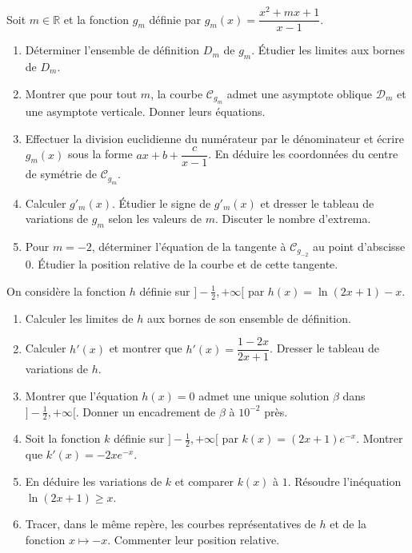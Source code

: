\documentclass[11pt]{article}
\begin{document}
\begin{exercice}
Soit $m \in \mathbb{R}$ et la fonction $g_m$ définie par $g_m(x) = \dfrac{x^2 + mx + 1}{x - 1}$.
\begin{enumerate}
    \item Déterminer l'ensemble de définition $D_m$ de $g_m$. Étudier les limites aux bornes de $D_m$.
    \item Montrer que pour tout $m$, la courbe $\mathcal{C}_{g_m}$ admet une asymptote oblique $\mathcal{D}_m$ et une asymptote verticale. Donner leurs équations.
    \item Effectuer la division euclidienne du numérateur par le dénominateur et écrire $g_m(x)$ sous la forme $ax + b + \dfrac{c}{x-1}$. En déduire les coordonnées du centre de symétrie de $\mathcal{C}_{g_m}$.
    \item Calculer $g'_m(x)$. Étudier le signe de $g'_m(x)$ et dresser le tableau de variations de $g_m$ selon les valeurs de $m$. Discuter le nombre d'extrema.
    \item Pour $m = -2$, déterminer l'équation de la tangente à $\mathcal{C}_{g_{-2}}$ au point d'abscisse $0$. Étudier la position relative de la courbe et de cette tangente.
\end{enumerate}
\end{exercice}

\begin{exercice}
On considère la fonction $h$ définie sur $]-\frac{1}{2}, +\infty[$ par $h(x) = \ln(2x+1) - x$.
\begin{enumerate}
    \item Calculer les limites de $h$ aux bornes de son ensemble de définition.
    \item Calculer $h'(x)$ et montrer que $h'(x) = \dfrac{1 - 2x}{2x+1}$. Dresser le tableau de variations de $h$.
    \item Montrer que l'équation $h(x) = 0$ admet une unique solution $\beta$ dans $]-\frac{1}{2}, +\infty[$. Donner un encadrement de $\beta$ à $10^{-2}$ près.
    \item Soit la fonction $k$ définie sur $]-\frac{1}{2}, +\infty[$ par $k(x) = (2x+1)e^{-x}$. Montrer que $k'(x) = -2x e^{-x}$.
    \item En déduire les variations de $k$ et comparer $k(x)$ à $1$. Résoudre l'inéquation $\ln(2x+1) \geqslant x$.
    \item Tracer, dans le même repère, les courbes représentatives de $h$ et de la fonction $x \mapsto -x$. Commenter leur position relative.
\end{enumerate}
\end{exercice}
\end{document}
